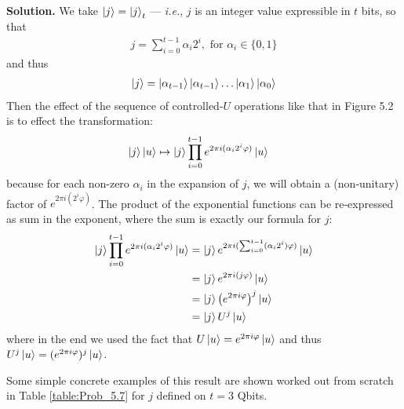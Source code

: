 \documentclass{article}
\begin{document}
\begin{enumerate}[label=\textbf{(\arabic*)}]
\textbf{Solution.} We take $\ket{j} = \ket{j}_{t}$ --- \textit{i.e.}, $j$ is an integer value expressible in $t$ bits, so that
\begin{align}
    j = \sum_{i=0}^{t-1} \alpha_i 2^i, \text{ for } \alpha_i \in \{0, 1\}
\end{align}
and thus
\begin{align}
    \ket{j} = \ket{\alpha_{t-1}}\ket{\alpha_{t-1}}\ldots\ket{\alpha_{1}}\ket{\alpha_{0}}
\end{align}
Then the effect of the sequence of controlled-$U$ operations like that in Figure 5.2 is to effect the transformation:
\begin{align}
    \ket{j}\ket{u} 
    &\mapsto
    \ket{j}\prod_{i=0}^{t-1}{e^{2\pi i (\alpha_i 2^i \varphi)}}\ket{u}
\end{align}
because for each non-zero $\alpha_i$ in the expansion of $j$, we will obtain a (non-unitary) factor of $e^{2\pi i (2^i \varphi)}$. The product of the exponential functions can be re-expressed as sum in the exponent, where the sum is exactly our formula for $j$: 
\begin{align}
    \ket{j}\prod_{i=0}^{t-1}{e^{2\pi i (\alpha_i 2^i \varphi)}}\ket{u}
    &=
    \ket{j}{e^{2\pi i (\sum_{i=0}^{t-1}(\alpha_i 2^i) \varphi)}}\ket{u}\\
    &=
    \ket{j}{e^{2\pi i (j \varphi)}}\ket{u}\\
    &=
    \ket{j}{\left(e^{2\pi i \varphi}\right)^j}\ket{u}\\
    &=
    \ket{j}{U^j}\ket{u}\\
\end{align}
where in the end we used the fact that $U\ket{u} = e^{2\pi i \varphi}\ket{u}$ and thus $U^{j}\ket{u} = (e^{2\pi i \varphi})^j\ket{u}$.

Some simple concrete examples of this result are shown worked out from scratch in Table \ref{table:Prob_5.7} for $j$ defined on $t=3$ Qbits.


\end{enumerate}
\end{document}
